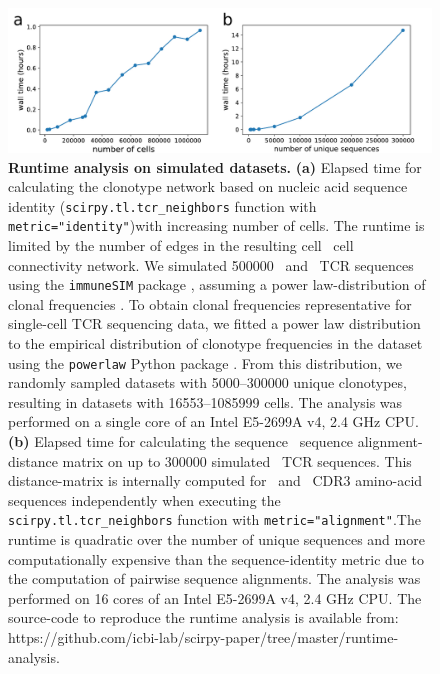 \documentclass{article}
\begin{document}
\newpage
\begin{figure}[H]
  \centering
  \includegraphics[width=7in]{../figures/runtime.pdf}
  \caption{
    \textbf{Runtime analysis on simulated datasets.}
    \textbf{(a)} Elapsed time for calculating the clonotype network based on nucleic acid sequence identity 
    (\texttt{scirpy.tl.tcr\_neighbors} function with \VerbatimQuotes\texttt{metric="identity"})\EnableQuotes with increasing number of cells. 
    The runtime is limited by the number of edges in the resulting cell \texttimes\ cell connectivity network.
    We simulated \num{500000} \textalpha\ and \textbeta\ TCR sequences using the \texttt{immuneSIM} package \cite{Weber2020}, 
    assuming a power law-distribution of clonal frequencies \cite{Greiff2015, Weber2020}.
    To obtain clonal frequencies representative for single-cell TCR sequencing data, we fitted a power law distribution
    to the empirical distribution of clonotype frequencies in the \textcite{Wu2020-vp} dataset using the \texttt{powerlaw}
    Python package \cite{Alstott2014}. From this distribution, we randomly sampled datasets with 
    \SIrange{5000}{300000}{} unique clonotypes, resulting in datasets with \SIrange{16553}{1085999}{} cells. 
    The analysis was performed on a single core of an Intel E5-2699A v4, 2.4 GHz CPU. 
    \textbf{(b)} Elapsed time for calculating the sequence  \texttimes\ sequence alignment-distance matrix on up to \num{300000} simulated \textalpha\ TCR sequences.
    This distance-matrix is internally computed for \textalpha\ and \textbeta\ CDR3 amino-acid sequences independently when executing the 
    \texttt{scirpy.tl.tcr\_neighbors} function with  \VerbatimQuotes\texttt{metric="alignment"}.\EnableQuotes The runtime is quadratic over 
    the number of unique sequences and more computationally expensive than the sequence-identity
    metric due to the computation of pairwise sequence alignments. The analysis was performed on 16 cores of an Intel E5-2699A v4, 2.4 GHz CPU. 
    The source-code to reproduce the runtime analysis is available from: https://github.com/icbi-lab/scirpy-paper/tree/master/runtime-analysis.}
\end{figure}
\end{document}
